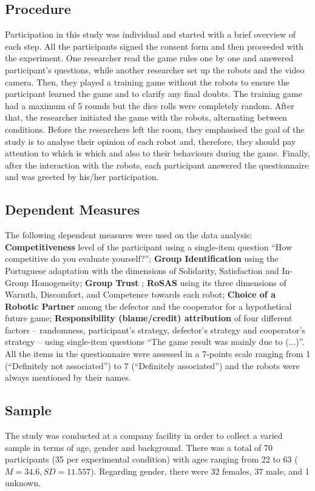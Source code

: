 \subsection{Procedure}
Participation in this study was individual and started with a brief overview of each step. All the participants signed the consent form and then proceeded with the experiment. One researcher read the game rules one by one and answered participant's questions, while another researcher set up the robots and the video camera. Then, they played a training game without the robots to ensure the participant learned the game and to clarify any final doubts. The training game had a maximum of 5 rounds but the dice rolls were completely random. After that, the researcher initiated the game with the robots, alternating between conditions. Before the researchers left the room, they emphasised the goal of the study is to analyse their opinion of each robot and, therefore, they should pay attention to which is which and also to their behaviours during the game. Finally, after the interaction with the robots, each participant answered the questionnaire and was greeted by his/her participation.


\subsection{Dependent Measures}
The following dependent measures were used on the data analysis: \textbf{Competitiveness} level of the participant using a single-item question ``How competitive do you evaluate yourself?''; \textbf{Group Identification} \cite{leach2008group} using the Portuguese adaptation \cite{ramos2011adaptaccao} with the dimensions of Solidarity, Satisfaction and In-Group Homogeneity; \textbf{Group Trust} \cite{allen2004exploring}; \textbf{RoSAS} \cite{carpinella2017robotic} using its three dimensions of Warmth, Discomfort, and Competence towards each robot; \textbf{Choice of a Robotic Partner} among the defector and the cooperator for a hypothetical future game; \textbf{Responsibility (blame/credit) attribution} of four different factors -- randomness, participant's strategy, defector's strategy and cooperator's strategy -- using single-item questions ``The game result was mainly due to (...)''.
All the items in the questionnaire were assessed in a 7-points scale ranging from 1 (``Definitely not associated'') to 7 (``Definitely associated'') and the robots were always mentioned by their names.

\subsection{Sample}
The study was conducted at a company facility in order to collect a varied sample in terms of age, gender and background. There was a total of 70 participants (35 per experimental condition) with ages ranging from 22 to 63 ($M=34.6, SD=11.557$). Regarding gender, there were 32 females, 37 male, and 1 unknown.


